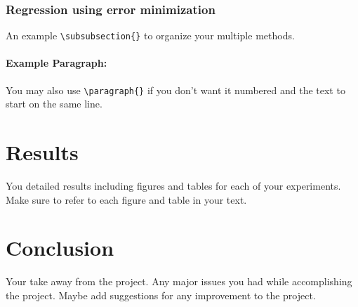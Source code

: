 \documentclass[12pt,twoside,a4paper]{article}
\begin{document}
\subsubsection{Regression using error minimization }
An example \verb'\subsubsection{}' to organize your multiple methods.  
\paragraph{Example Paragraph:} You may also use \verb'\paragraph{}' if you don't want it numbered and the text to start on the same line.
\section{Results}
You detailed results including figures and tables for each of your experiments.  Make sure to refer to each figure and table in your text.
\section{Conclusion}
Your take away from the project.  Any major issues you had while accomplishing the project.  Maybe add suggestions for any improvement to the project.
{\small

}
\end{document}
